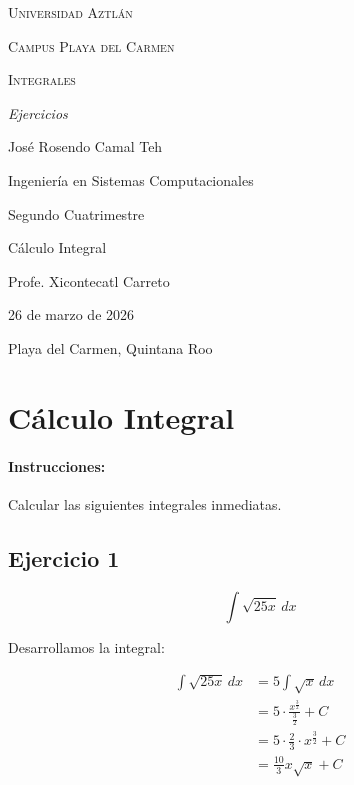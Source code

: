 \documentclass[12pts]{article}
\begin{document}
	\begin{titlepage}
		\centering
		{\scshape\LARGE Universidad Aztlán \par}
		\vspace{1cm}
		{\scshape\Large Campus Playa del Carmen \par}
		\vspace{3cm}
		{\scshape\Huge Integrales \par}
		\vspace{1cm}
		{\itshape\Large Ejercicios \par}
		\vspace{3cm}
		{\Large José Rosendo Camal Teh \par}
		\vfill
		{\Large Ingeniería en Sistemas Computacionales \par}
		{\Large Segundo Cuatrimestre \par}
		{\Large Cálculo Integral \par}
		\vfill
		{\Large Profe. Xicontecatl Carreto \par}
		\vfill
		{\Large 26 de marzo de 2026 \par}
		\vfill
		{\Large Playa del Carmen, Quintana Roo \par}
	\end{titlepage}

	\section*{Cálculo Integral}
	\paragraph{\textbf{Instrucciones:}} Calcular las siguientes integrales inmediatas.

	\subsection*{Ejercicio 1}

	\[ \int \sqrt{25x} \, dx \]

	Desarrollamos la integral:

	\begin{align*}
		\int \sqrt{25x} \, dx &= 5 \int \sqrt{x} \, dx \\
		&= 5 \cdot \frac{ x^{ \frac{3}{2} } }{ \frac{3}{2} } + C \\
		&= 5 \cdot \frac{2}{3} \cdot x^{ \frac{3}{2} } + C \\
		&= \frac{10}{3} x \sqrt{x} + C
	\end{align*}
\end{document}

